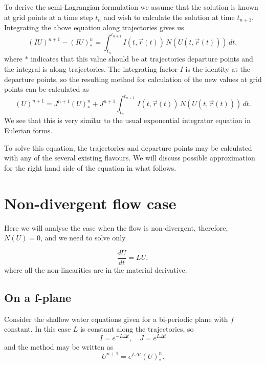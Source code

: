 \documentclass[10pt,a4paper]{article}
\begin{document}
To derive the semi-Lagrangian formulation we assume that the solution is known at grid points at a time step $t_n$ and wish to calculate the solution at time $t_{n+1}$. Integrating the above equation along trajectories gives us 
\begin{equation}
(IU)^{n+1}-(IU)^{n}_{*}=\int_{t_n}^{t_{n+1}} I(t, \vec{r}(t))\, N(U(t, \vec{r}(t)))\, dt,
\end{equation}
where $*$ indicates that this value should be at trajectories departure points and the integral is along trajectories. The integrating factor $I$ is the identity at the departure points, so the resulting method for calculation of the new values at grid points can be calculated as
\begin{equation}
(U)^{n+1}=J^{n+1}(U)^{n}_{*}+J^{n+1}\int_{t_n}^{t_{n+1}} \, I(t, \vec{r}(t))\, N(U(t, \vec{r}(t)))\,dt .
\end{equation}
We see that this is very similar to the usual exponential integrator equation in Eulerian forms.

To solve this equation, the trajectories and departure points may be calculated with any of the several existing flavours. We will discuss possible approximation for the right hand side of the equation in what follows.

\section{Non-divergent flow case}

Here we will analyse the case when the flow is non-divergent, therefore, $N(U)=0$, and we need to solve only

\begin{equation}
\frac{dU}{dt}=L U,
\label{eq:swe}
\end{equation}
where all the non-linearities are in the material derivative.


\subsection{On a f-plane} 

Consider the shallow water equations given for a bi-periodic plane with $f$ constant. In this case $L$ is constant along the trajectories, so
\begin{equation}
I=e^{-L\Delta t}, \quad J=e^{L\Delta t}
\end{equation}
and the method may be written as
\begin{equation}
U^{n+1}=e^{L\Delta t}(U)^{n}_{*}.
\end{equation}
\end{document}

